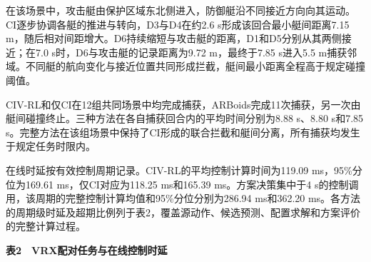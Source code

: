 \documentclass[UTF8,a4paper,zihao=5,fontset=none]{ctexart}
\begin{document}
在该场景中，攻击艇由保护区域东北侧进入，防御艇沿不同接近方向向其运动。CI逐步协调各艇的推进与转向，D3与D4在约2.6
s形成该回合最小艇间距离7.15
m，随后相对间距增大。D6持续缩短与攻击艇的距离，D1和D5分别从其两侧接近；在7.0
s时，D6与攻击艇的记录距离为9.72 m，最终于7.85 s进入5.5
m捕获邻域。不同艇的航向变化与接近位置共同形成拦截，艇间最小距离全程高于规定碰撞阈值。

CIV-RL和仅CI在12组共同场景中均完成捕获，ARBoids完成11次捕获，另一次由艇间碰撞终止。三种方法在各自捕获回合内的平均时间分别为8.88
s、8.80 s和7.85
s。完整方法在该组场景中保持了CI形成的联合拦截和艇间分离，所有捕获均发生于规定任务时限内。

在线时延按有效控制周期记录。CIV-RL的平均控制计算时间为119.09
ms，95\%分位为169.61 ms，仅CI对应为118.25 ms和165.39 ms。方案决策集中于4
s的控制调用，该周期的完整控制计算均值和95\%分位分别为286.94 ms和362.20
ms。各方法的周期级时延及超期比例列于表2，覆盖源动作、候选预测、配置求解和方案评价的完整计算过程。

\begin{center}\small\bfseries 表2　VRX配对任务与在线控制时延\end{center}
\end{document}

